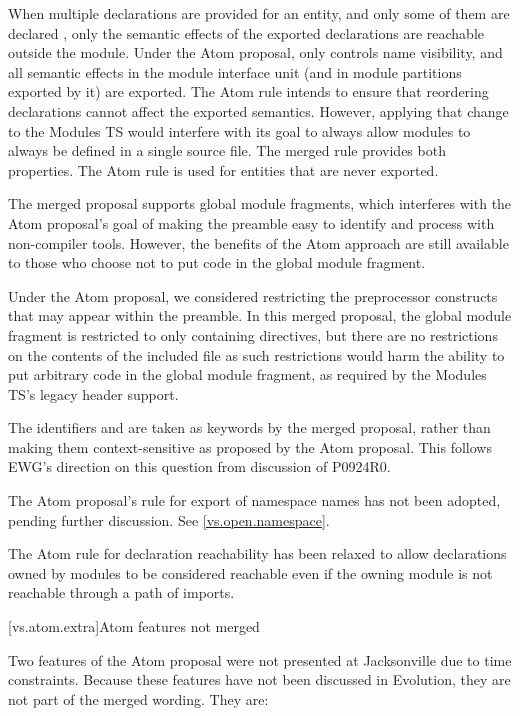\pnum
When multiple declarations are provided for an entity,
and only some of them are declared ,
only the semantic effects of the exported declarations
are reachable outside the module.
Under the Atom proposal,
 only controls name visibility,
and all semantic effects in the module interface unit
(and in module partitions exported by it)
are exported.
The Atom rule intends to ensure that
reordering declarations cannot affect the exported semantics.
However, applying that change to the Modules TS
would interfere with its goal to always allow modules
to always be defined in a single source file.
The merged rule provides both properties.
The Atom rule is used for entities that are never exported.

\pnum
The merged proposal supports global module fragments,
which interferes with the Atom proposal's goal
of making the preamble easy to identify and process
with non-compiler tools.
However, the benefits of the Atom approach are still available
to those who choose not to put code in the global module fragment.

\pnum
Under the Atom proposal,
we considered restricting the preprocessor constructs that may appear
within the preamble.
In this merged proposal,
the global module fragment is restricted
to only containing  directives,
but there are no restrictions on the contents
of the included file
as such restrictions would harm the ability
to put arbitrary code in the global module fragment,
as required by the Modules TS's legacy header support.

\pnum
The identifiers  and  are taken as keywords
by the merged proposal,
rather than making them context-sensitive as proposed by the Atom proposal.
This follows EWG's direction on this question from discussion of P0924R0.

\pnum
The Atom proposal's rule for export of namespace names has not been adopted,
pending further discussion. See \ref{vs.open.namespace}.

\pnum
The Atom rule for declaration reachability
has been relaxed to allow declarations owned by modules
to be considered reachable even if the owning module
is not reachable through a path of imports.

[vs.atom.extra]{Atom features not merged}

\pnum
Two features of the Atom proposal were not presented at Jacksonville
due to time constraints.
Because these features have not been discussed in Evolution,
they are not part of the merged wording. They are:

